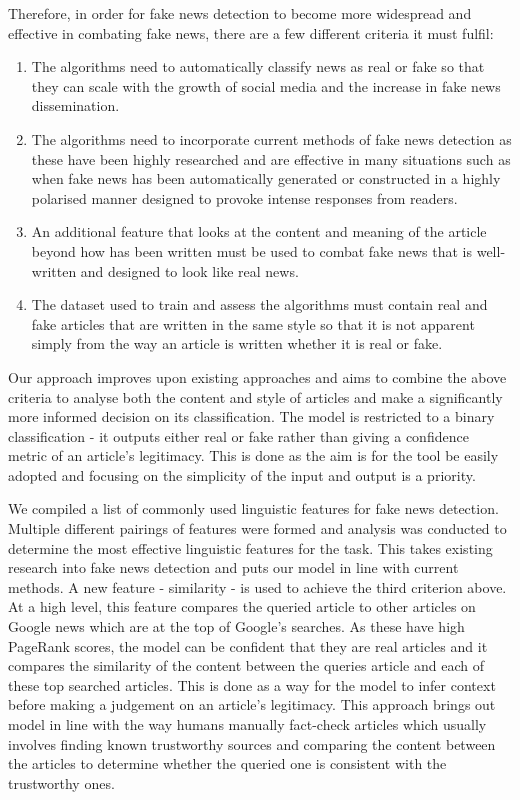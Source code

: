 \documentclass{article}
\begin{document}
Therefore, in order for fake news detection to become more widespread and effective in combating fake news, there are a few different criteria it must fulfil:

\begin{enumerate}
  \item The algorithms need to automatically classify news as real or fake so that they can scale with the growth of social media and the increase in fake news dissemination.
  \item The algorithms need to incorporate current methods of fake news detection as these have been highly researched and are effective in many situations such as when fake news has been automatically generated or constructed in a highly polarised manner designed to provoke intense responses from readers.
  \item An additional feature that looks at the content and meaning of the article beyond how has been written must be used to combat fake news that is well-written and designed to look like real news.
  \item The dataset used to train and assess the algorithms must contain real and fake articles that are written in the same style so that it is not apparent simply from the way an article is written whether it is real or fake.
\end{enumerate}

Our approach improves upon existing approaches and aims to combine the above criteria to analyse both the content and style of articles and make a significantly more informed decision on its classification. The model is restricted to a binary classification - it outputs either real or fake rather than giving a confidence metric of an article's legitimacy. This is done as the aim is for the tool be easily adopted and focusing on the simplicity of the input and output is a priority.

We compiled a list of commonly used linguistic features for fake news detection. Multiple different pairings of features were formed and analysis was conducted to determine the most effective linguistic features for the task. This takes existing research into fake news detection and puts our model in line with current methods. A new feature - similarity - is used to achieve the third criterion above. At a high level, this feature compares the queried article to other articles on Google news which are at the top of Google's searches. As these have high PageRank scores, the model can be confident that they are real articles and it compares the similarity of the content between the queries article and each of these top searched articles. This is done as a way for the model to infer context before making a judgement on an article's legitimacy. This approach brings out model in line with the way humans manually fact-check articles which usually involves finding known trustworthy sources and comparing the content between the articles to determine whether the queried one is consistent with the trustworthy ones.
\end{document}
